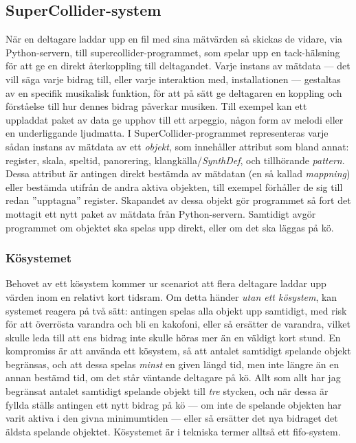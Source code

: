 \documentclass[11pt, a4paper]{article} %
\begin{document}
\subsection*{SuperCollider-system}
När en deltagare laddar upp en fil med sina mätvärden så skickas de vidare, via Python-servern, till \gls{supercollider}-programmet, som spelar upp en tack-hälsning för att ge en direkt återkoppling till deltagandet. Varje instans av mätdata --- det vill säga varje bidrag till, eller varje interaktion med, installationen --- gestaltas av en specifik musikalisk funktion, för att på sätt ge deltagaren en koppling och förståelse till hur dennes bidrag påverkar musiken. Till exempel kan ett uppladdat paket av data ge upphov till ett arpeggio, någon form av melodi eller en underliggande ljudmatta. I SuperCollider-programmet representeras varje sådan instans av mätdata av ett \emph{objekt}, som innehåller attribut som bland annat: register, skala, speltid, panorering, klangkälla/\emph{SynthDef}, och tillhörande \emph{\gls{pattern}}. Dessa attribut är antingen direkt bestämda av mätdatan (en så kallad \emph{mappning}) eller bestämda utifrån de andra aktiva objekten, till exempel förhåller de sig till redan ''upptagna'' register. Skapandet av dessa objekt gör programmet så fort det mottagit ett nytt paket av mätdata från Python-servern. Samtidigt avgör programmet om objektet ska spelas upp direkt, eller om det ska läggas på kö. 

\subsubsection*{Kösystemet}
Behovet av ett kösystem kommer ur scenariot att flera deltagare laddar upp värden inom en relativt kort tidsram. Om detta händer \emph{utan ett kösystem}, kan systemet reagera på två sätt: antingen spelas alla objekt upp samtidigt, med risk för att överrösta varandra och bli en kakofoni, eller så ersätter de varandra, vilket skulle leda till att ens bidrag inte skulle höras mer än en väldigt kort stund. En kompromiss är att använda ett kösystem, så att antalet samtidigt spelande objekt begränsas, och att dessa spelas \emph{minst} en given längd tid, men inte längre än en annan bestämd tid, om det står väntande deltagare på kö. Allt som allt har jag begränsat antalet samtidigt spelande objekt till \emph{tre} stycken, och när dessa är fyllda ställs antingen ett nytt bidrag på kö --- om inte de spelande objekten har varit aktiva i den givna minimumtiden --- eller så ersätter det nya bidraget det äldsta spelande objektet. Kösystemet är i tekniska termer alltså ett \gls{fifo}-system.
\end{document}
